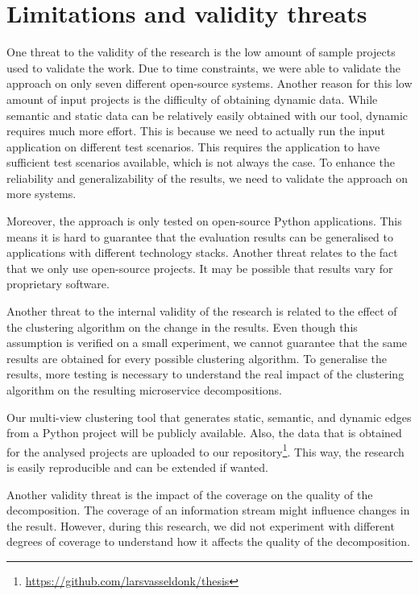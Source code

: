 \section{Limitations and validity threats}
One threat to the validity of the research is the low amount of sample projects used to validate the work. Due to time constraints, we were able to validate the approach on only seven different open-source systems. Another reason for this low amount of input projects is the difficulty of obtaining dynamic data. While semantic and static data can be relatively easily obtained with our tool, dynamic requires much more effort. This is because we need to actually run the input application on different test scenarios. This requires the application to have sufficient test scenarios available, which is not always the case. To enhance the reliability and generalizability of the results, we need to validate the approach on more systems. \par
Moreover, the approach is only tested on open-source Python applications. This means it is hard to guarantee that the evaluation results can be generalised to applications with different technology stacks. Another threat relates to the fact that we only use open-source projects. It may be possible that results vary for proprietary software.\par

Another threat to the internal validity of the research is related to the effect of the clustering algorithm on the change in the results. Even though this assumption is verified on a small experiment, we cannot guarantee that the same results are obtained for every possible clustering algorithm. To generalise the results, more testing is necessary to understand the real impact of the clustering algorithm on the resulting microservice decompositions. \par

Our multi-view clustering tool that generates static, semantic, and dynamic edges from a Python project will be publicly available. Also, the data that is obtained for the analysed projects are uploaded to our repository\footnote{\href{https://github.com/larsvasseldonk/thesis}{https://github.com/larsvasseldonk/thesis}}. This way, the research is easily reproducible and can be extended if wanted. \par

Another validity threat is the impact of the coverage on the quality of the decomposition. The coverage of an information stream might influence changes in the result. However, during this research, we did not experiment with different degrees of coverage to understand how it affects the quality of the decomposition. \par

